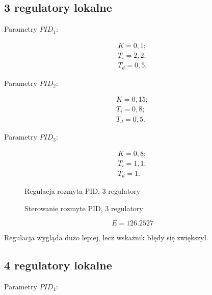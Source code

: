 \subsection{3 regulatory lokalne}

Parametry $PID_1$:

\begin{equation}
\begin{matrix}
    	K = 0,1;\\
    	T_i = 2,2;\\
    	T_d = 0,5.
\end{matrix}
\end{equation}

Parametry $PID_2$:

\begin{equation}
\begin{matrix}
    	K = 0,15;\\
    	T_i = 0,8;\\
    	T_d = 0,5.
\end{matrix}
\end{equation}

Parametry $PID_3$:

\begin{equation}
\begin{matrix}
    	K = 0,8;\\
    	T_i = 1,1;\\
    	T_d = 1.
\end{matrix}
\end{equation}


\begin{figure}[H]
\centering

\caption{Regulacja rozmyta PID, 3 regulatory}
\end{figure}

\begin{figure}[H]
\centering

\caption{Sterowanie rozmyte PID, 3 regulatory}
\end{figure}

\begin{equation}
    E = \num{126,2527}
\end{equation}

Regulacja wygląda dużo lepiej, lecz wskażnik błędy się zwiększył.


\subsection{4 regulatory lokalne}

Parametry $PID_1$:

